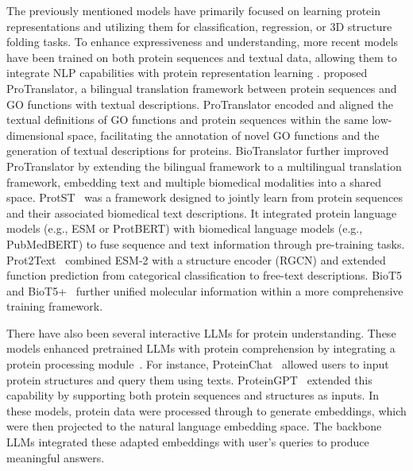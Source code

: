 The previously mentioned models have primarily focused on learning protein representations and utilizing them for classification, regression, or 3D structure folding tasks. To enhance expressiveness and understanding, more recent models have been trained on both protein sequences and textual data, allowing them to integrate NLP capabilities with protein representation learning \citep{wang2023instructprotein, liu2024prott3, zhuo2024protllm,jin2024prollm}.
\citet{xu2022protranslator} proposed ProTranslator, a bilingual translation framework between protein sequences and GO functions with textual descriptions. ProTranslator encoded and aligned the textual definitions of GO functions and protein sequences within the same low-dimensional space, facilitating the annotation of novel GO functions and the generation of textual descriptions for proteins. BioTranslator \citep{xu2023multilingual} further improved ProTranslator by extending the bilingual framework to a multilingual translation framework, embedding text and multiple biomedical modalities into a shared space.
ProtST~\cite{xu2023protst} was a framework designed to jointly learn from protein sequences and their associated biomedical text descriptions. It integrated protein language models (e.g., ESM or ProtBERT) with biomedical language models (e.g., PubMedBERT) to fuse sequence and text information through pre-training tasks. Prot2Text~\citep{abdine2024prot2text} combined ESM-2 with a structure encoder (RGCN) and extended function prediction from categorical classification to free-text descriptions. BioT5 and BioT5+~\citep{pei2023biot5,pei2024biot5+} further unified molecular information within a more comprehensive training framework.

There have also been several interactive LLMs for protein understanding. These models enhanced pretrained LLMs with protein comprehension by integrating a protein processing module~\citep{wu2024structure, wang2024protchatgpt,wang2024long}. For instance, ProteinChat~\citep{guo2023proteinchat} allowed users to input protein structures and query them using texts. ProteinGPT~\citep{xiao2024proteingpt} extended this capability by supporting both protein sequences and structures as inputs. In these models, protein data were processed through \proteinllms to generate embeddings, which were then projected to the natural language embedding space. The backbone LLMs integrated these adapted embeddings with user’s queries to produce meaningful answers.